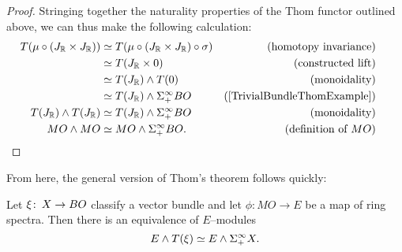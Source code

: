 \begin{proof}
Stringing together the naturality properties of the Thom functor outlined above, we can thus make the following calculation:
\begin{align*}
T(\mu \circ (J_{\R} \times J_{\R})) & \simeq T(\mu \circ (J_{\R} \times J_{\R}) \circ \sigma) & \text{(homotopy invariance)} \\
& \simeq T(J_{\R} \times 0) & \text{(constructed lift)} \\
& \simeq T(J_{\R}) \sm T(0) & \text{(monoidality)} \\
& \simeq T(J_{\R}) \sm \Susp^\infty_+ BO & \text{(\Cref{TrivialBundleThomExample})} \\
T(J_{\R}) \sm T(J_{\R}) & \simeq T(J_{\R}) \sm \Susp^\infty_+ BO & \text{(monoidality)} \\
MO \sm MO & \simeq MO \sm \Susp^\infty_+ BO. & \text{(definition of $MO$)} & \phantom{.} \qedhere
\end{align*}
\end{proof}

\noindent From here, the general version of Thom's theorem follows quickly:

\begin{theorem}
Let $\xi\colon\thinspace X \to BO$ classify a vector bundle and let $\phi: MO \to E$ be a map of ring spectra. Then there is an equivalence of $E$--modules \[E \wedge T(\xi) \simeq E \wedge \Sigma^\infty_+ X.\]
\end{theorem}

